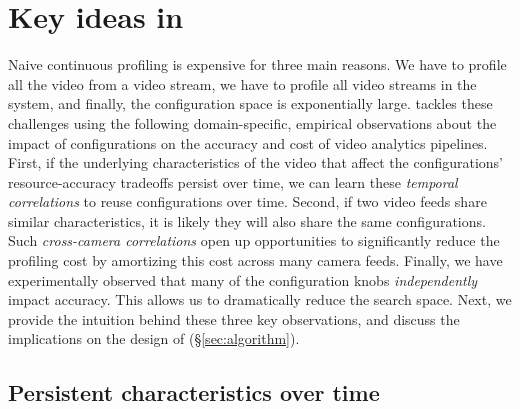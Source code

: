 \section{Key ideas in {\name}}
\label{sec:insights}

Naive continuous profiling is expensive for three main reasons. We have to profile all the video from a video stream, we have to profile all video streams in the system, and finally, the configuration space is exponentially large.
\name tackles these challenges using the following domain-specific, empirical observations about the impact of configurations on the accuracy and cost of video analytics pipelines.
First, if the underlying characteristics of the video that affect the configurations' resource-accuracy tradeoffs persist over time, we can learn these {\em temporal correlations} to reuse configurations over time. 
Second, if two video feeds share similar characteristics, it is likely they will also share the same configurations. Such {\em cross-camera correlations} open up opportunities to significantly reduce the profiling cost by amortizing this cost across many camera feeds. %
Finally, we have experimentally observed that many of the configuration knobs {\em independently} impact accuracy. This allows us to dramatically reduce the search space. Next, we provide the intuition behind these three key observations, and discuss the implications on the design of {\name} (\S\ref{sec:algorithm}).


\subsection{Persistent characteristics over time}
\label{subsec:temporal}

